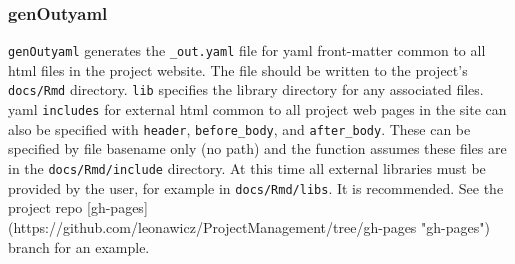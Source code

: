 \documentclass{article}\usepackage[]{graphicx}\usepackage[]{color}
\begin{document}
\subsubsection{genOutyaml}

\texttt{genOutyaml} generates the \texttt{\_out.yaml} file for yaml front-matter common to all html files in the project website.
The file should be written to the project's \texttt{docs/Rmd} directory.
\texttt{lib} specifies the library directory for any associated files.
yaml \texttt{includes} for external html common to all project web pages in the site can also be specified with \texttt{header}, \texttt{before\_body}, and \texttt{after\_body}.
These can be specified by file basename only (no path) and the function assumes these files are in the \texttt{docs/Rmd/include} directory.
At this time all external libraries must be provided by the user, for example in \texttt{docs/Rmd/libs}.
It is recommended. See the project repo [gh-pages](https://github.com/leonawicz/ProjectManagement/tree/gh-pages "gh-pages") branch for an example.
\end{document}
